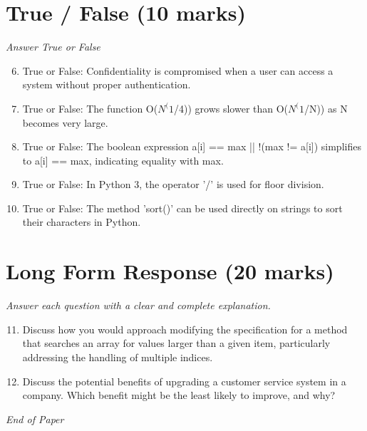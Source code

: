 \documentclass[12pt]{article}
\begin{document}
\section*{True / False (10 marks)}
\textit{Answer True or False}
\begin{enumerate}[label=\arabic*.]
\setcounter{enumi}{5}
\item True or False: Confidentiality is compromised when a user can access a system without proper authentication.
\item True or False: The function O($N^(1$/4)) grows slower than O($N^(1$/N)) as N becomes very large.
\item True or False: The boolean expression a[i] == max || !(max != a[i]) simplifies to a[i] == max, indicating equality with max.
\item True or False: In Python 3, the operator '/' is used for floor division.
\item True or False: The method 'sort()' can be used directly on strings to sort their characters in Python.
\end{enumerate}

\section*{Long Form Response (20 marks)}
\textit{Answer each question with a clear and complete explanation.}
\begin{enumerate}[label=\arabic*.]
\setcounter{enumi}{10}
\item Discuss how you would approach modifying the specification for a method that searches an array for values larger than a given item, particularly addressing the handling of multiple indices.
\item Discuss the potential benefits of upgrading a customer service system in a company. Which benefit might be the least likely to improve, and why?
\end{enumerate}

\vfill
\noindent\textit{End of Paper}
\end{document}
